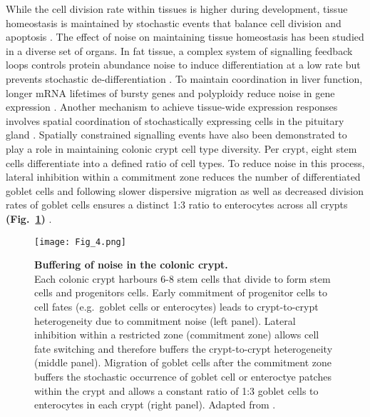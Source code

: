 While the cell division rate within tissues is higher during development, tissue homeostasis is maintained by stochastic events that balance cell division and apoptosis \citep{Ranft2010}. 
The effect of noise on maintaining tissue homeostasis has been studied in a diverse set of organs. 
In fat tissue, a complex system of signalling feedback loops controls protein abundance noise to induce differentiation at a low rate but prevents stochastic de-differentiation \citep{Ahrends2014}. 
To maintain coordination in liver function, longer mRNA lifetimes of bursty genes and polyploidy reduce noise in gene expression \citep{BaharHalpern2015}. 
Another mechanism to achieve tissue-wide expression responses involves spatial coordination of stochastically expressing cells in the pituitary gland \citep{Featherstone2016}. 
Spatially constrained signalling events have also been demonstrated to play a role in maintaining colonic crypt cell type diversity. 
Per crypt, eight stem cells differentiate into a defined ratio of cell types. To reduce noise in this process, lateral inhibition within a commitment zone reduces the number of differentiated goblet cells and following slower dispersive migration as well as decreased division rates of goblet cells ensures a distinct 1:3 ratio to enterocytes across all crypts \textbf{(Fig.~\ref{fig0:noise_tissue})} \citep{Toth2017}.


\begin{figure}[!h]
\centering
\texttt{[image: Fig\_4.png]}
\caption[Buffering of noise in the colonic crypt]{\textbf{Buffering of noise in the colonic crypt.}\\
Each colonic crypt harbours 6-8 stem cells that divide to form stem cells and progenitors cells. 
Early commitment of progenitor cells to cell fates (e.g.~goblet cells or enterocytes) leads to crypt-to-crypt heterogeneity due to commitment noise (left panel). 
Lateral inhibition within a restricted zone (commitment zone) allows cell fate switching and therefore buffers the crypt-to-crypt heterogeneity (middle panel). 
Migration of goblet cells after the commitment zone buffers the stochastic occurrence of goblet cell or enteroctye patches within the crypt and allows a constant ratio of 1:3 goblet cells to enterocytes in each crypt (right panel). 
Adapted from \citep{Toth2017}.}
\label{fig0:noise_tissue}
\end{figure}

